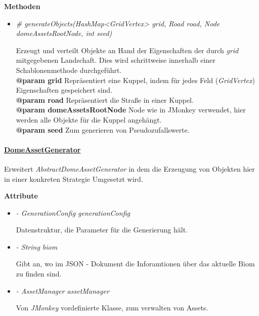             \textbf{Methoden}					
            \begin{itemize}
                \item  \textit{\# generateObjects(HashMap<GridVertex> grid, Road road, Node domeAssetsRootNode, int seed)}
                    \begin{leftbar}[0.9\linewidth]
                        Erzeugt und verteilt Objekte an Hand der Eigenschaften der durch \textit{grid} mitgegebenen Landschaft. Dies wird schrittweise innerhalb
                            einer Schablonenmethode durchgeführt.\\
                        \textbf{@param grid} Repräsentiert eine Kuppel, indem für jedes Feld (\textit{GridVertex}) Eigenschaften gespeichert sind.\\
                        \textbf{@param road} Repräsentiert die Straße in einer Kuppel.\\
                        \textbf{@param domeAssetsRootNode} Node wie in JMonkey verwendet, hier werden alle Objekte für die Kuppel angehängt.\\
                        \textbf{@param seed} Zum generieren von Pseudozufallswerte.
                    \end{leftbar}  
            \end{itemize}
            
            
            
            \paragraph{\underline{DomeAssetGenerator}} \mbox{}\par
            Erweitert \textit{AbstractDomeAssetGenerator} in dem die Erzeugung von Objekten hier in einer konkreten Strategie Umgesetzt wird.\par
            
            \textbf{Attribute}
            \begin{itemize}
                \item  \textit{- GenerationConfig generationConfig} 
                    \begin{leftbar}[0.9\linewidth]
                        Datenstruktur, die Parameter für die Generierung hält.
                    \end{leftbar}

                    \item  \textit{- String biom} 
                    \begin{leftbar}[0.9\linewidth]
                        Gibt an, wo im JSON - Dokument die Inforamtionen über das aktuelle Biom zu finden sind.
                    \end{leftbar}
                
                \item  \textit{- AssetManager assetManager} 
                    \begin{leftbar}[0.9\linewidth]
                        Von \textit{JMonkey} vordefinierte Klasse, zum verwalten von Assets.
                    \end{leftbar}
            \end{itemize}

